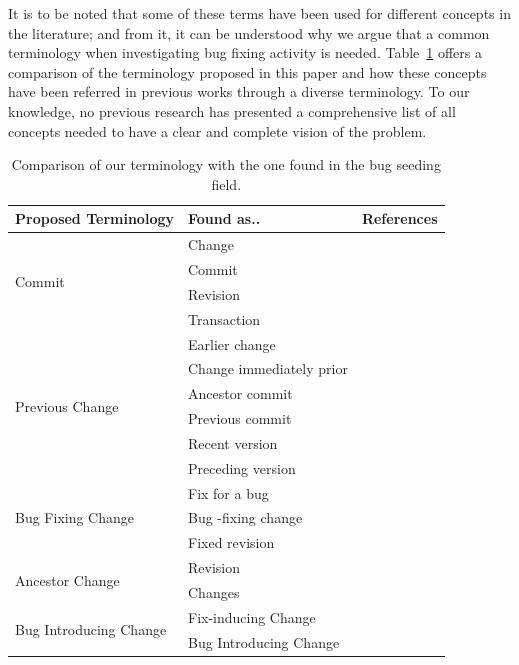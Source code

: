 \documentclass[a4paper, 12pt]{book}
\begin{document}
It is to be noted that some of these terms have been used for different concepts in the literature; and from it, it can be understood why we argue that a common terminology when investigating bug fixing activity is needed. Table~\ref{tab:tableComparison} offers a comparison of the terminology proposed in this paper and how these concepts have been referred in previous works through a diverse terminology. To our knowledge, no previous research has presented a comprehensive list of all concepts needed to have a clear and complete vision of the problem. 

\begin{table}
\centering
\newcommand{\specialcell}[2][l]{%
  \begin{tabular}[#1]{@{}l@{}}#2\end{tabular}}
\renewcommand{\arraystretch}{1.3}
\caption{Comparison of our terminology with the one found in the bug seeding field.}
\label{tab:tableComparison}

\begin{tabular}{lll}
\toprule
\textbf{Proposed Terminology} & \textbf{Found as..} & \textbf{References} \\
\midrule
 \multirow{4}{*}{Commit} &Change & \cite{da2016framework}\cite{kim2006automatic}\\
 &Commit& \cite{izquierdo2011developers}\\
 &Revision& \cite{kim2008classifying}\\
 &Transaction & \cite{sliwerski2005changes}\cite{bettenburg2013studying}\\
\hline
\multirow{6}{*}{Previous Change} &Earlier change & \cite{sliwerski2005changes}\\
 &Change immediately prior& \cite{williams2008szz}\\
 &Ancestor commit & \cite{blondeau2017testing}\\
 &Previous commit & \cite{izquierdo2011developers}\\
 &Recent version & \cite{kim2008classifying}\\
 &Preceding version & \cite{hata2010fault}\\
 \hline
\multirow{3}{*}{Bug Fixing Change} &Fix for a bug & \cite{sliwerski2005changes}\\
 &Bug -fixing change& \cite{da2016framework}\cite{kim2006automatic}\cite{williams2008szz}\cite{izquierdo2011developers}\cite{kim2008classifying}\\
 &Fixed revision& \cite{hata2010fault}\\
 \hline
\multirow{2}{*}{Ancestor Change} &Revision & \cite{sliwerski2005changes}\cite{da2016framework}\cite{kim2006automatic}\\
 &Changes& \cite{kim2008classifying}\\
\hline
\multirow{2}{*}{Bug Introducing Change} &Fix-inducing Change & \cite{sliwerski2005changes}\cite{williams2008szz}\\
 &Bug Introducing Change& \cite{da2016framework}\cite{kim2006automatic}\cite{kim2008classifying}\\
\bottomrule
\end{tabular}
\end{table}
\end{document}
